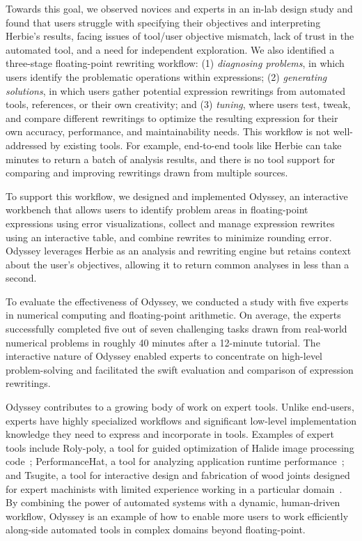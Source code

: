 Towards this goal, we
  observed novices and experts in an in-lab design study and
  found that users struggle with
  specifying their objectives and interpreting Herbie's results,
  facing issues of tool/user objective mismatch,
  lack of trust in the automated tool,
  and a need for independent exploration.
We also identified a three-stage
  floating-point rewriting workflow:
  (1) \textit{diagnosing problems},
    in which users identify the problematic operations within expressions;
  (2) \textit{generating solutions},
    in which users gather potential expression rewritings
    from automated tools, references, or their own creativity;
  and (3) \textit{tuning},
    where users test, tweak, and compare different rewritings
    to optimize the resulting expression
    for their own accuracy, performance, and maintainability needs.
This workflow is not well-addressed by existing tools. 
For example, 
  end-to-end tools like Herbie 
  can take minutes to return a batch of analysis results, 
  and there is no tool support for comparing
  and improving rewritings
  drawn from multiple sources.

To support this workflow, we designed and implemented Odyssey, 
  an interactive workbench that
  allows users to identify problem areas in floating-point 
  expressions using error visualizations, collect and manage 
  expression rewrites using an interactive table, and
  combine rewrites to minimize rounding error.
Odyssey leverages Herbie as an analysis and rewriting engine
  but retains context about the user's objectives, allowing it
  to return common analyses in less than a second.

To evaluate the effectiveness of Odyssey,
  we conducted a study with five experts
  in numerical computing and floating-point arithmetic.
On average,
  the experts successfully completed
  five out of seven challenging tasks
  drawn from real-world numerical problems
  in roughly 40 minutes after a 12-minute tutorial.
The interactive nature of Odyssey
  enabled experts to concentrate on high-level problem-solving
  and facilitated the swift evaluation and comparison of expression rewritings. 

  Odyssey contributes to a growing body of work
  on expert tools. Unlike end-users, experts have highly specialized workflows and significant low-level implementation knowledge they need to express and incorporate in tools. 
  Examples of expert tools include Roly-poly, a tool for guided optimization of Halide image processing code~\cite{ikarashi2021guidedOptimization}; 
  PerformanceHat, a tool for analyzing application runtime performance~\cite{cito2018performanceHat}; 
  and Tsugite, a tool for interactive design and fabrication of wood joints
  designed for expert machinists with limited experience working in a particular domain~\cite{larsson2020tsugite}.
By combining the power of automated systems
  with a dynamic, human-driven workflow,
  Odyssey is an example of how to enable more users
  to work efficiently along-side automated tools
  in complex domains beyond floating-point.

